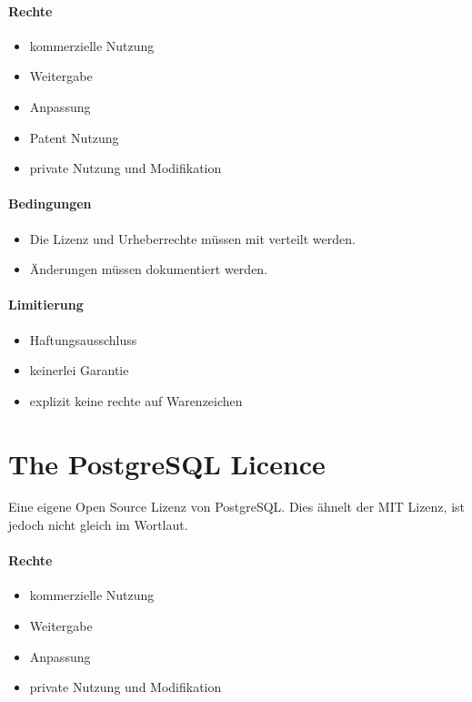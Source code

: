 \paragraph{Rechte}
\begin{itemize}
    \item kommerzielle Nutzung
    \item Weitergabe
    \item Anpassung
    \item Patent Nutzung %
    \item private Nutzung und Modifikation
\end{itemize}

\paragraph{Bedingungen}
\begin{itemize}
    \item Die Lizenz und Urheberrechte müssen mit verteilt werden.
    \item Änderungen müssen dokumentiert werden.
\end{itemize}

\paragraph{Limitierung}
\begin{itemize}
    \item Haftungsausschluss
    \item keinerlei Garantie
    \item explizit keine rechte auf Warenzeichen
\end{itemize}

\section{The PostgreSQL Licence}\label{sec:the-postgresql-licence}
Eine eigene Open Source Lizenz von PostgreSQL.
Dies ähnelt der MIT Lizenz, ist jedoch nicht gleich im Wortlaut.

\paragraph{Rechte}
\begin{itemize}
    \item kommerzielle Nutzung
    \item Weitergabe
    \item Anpassung
    \item private Nutzung und Modifikation
\end{itemize}

